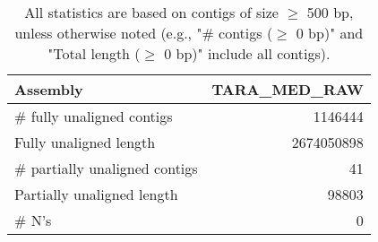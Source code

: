 \documentclass[12pt,a4paper]{article}
\begin{document}
\begin{table}[ht]
\begin{center}
\caption{All statistics are based on contigs of size $\geq$ 500 bp, unless otherwise noted (e.g., "\# contigs ($\geq$ 0 bp)" and "Total length ($\geq$ 0 bp)" include all contigs).}
\begin{tabular}{|l*{1}{|r}|}
\hline
Assembly & TARA\_MED\_RAW \\ \hline
\# fully unaligned contigs & 1146444 \\ \hline
Fully unaligned length & 2674050898 \\ \hline
\# partially unaligned contigs & 41 \\ \hline
Partially unaligned length & 98803 \\ \hline
\# N's & 0 \\ \hline
\end{tabular}
\end{center}
\end{table}
\end{document}

